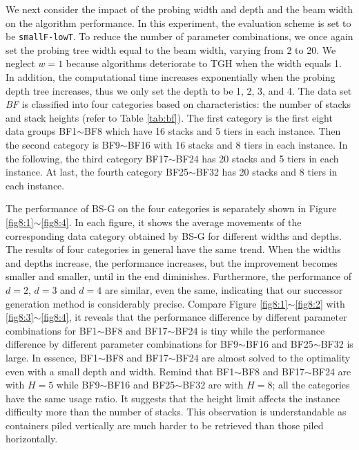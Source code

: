 \documentclass[review,3p,times,authoryear,12pt]{elsarticle}
\begin{document}
We next consider the impact of the probing width and depth and the beam width on the algorithm performance. In this experiment, the evaluation scheme is set to be \texttt{smallF-lowT}. To reduce the number of parameter combinations, we once again set the probing tree width equal to the beam width, varying from 2 to 20. We neglect $w=1$ because algorithms deteriorate to TGH when the width equals 1. In addition, the computational time increases exponentially when the probing depth tree increases, thus we only set the depth to be 1, 2, 3, and 4. The data set {\em BF} is classified into four categories based on characteristics: the number of stacks and stack heights (refer to Table \ref{tab:bf}). The first category is the first eight data groups BF1$\sim$BF8 which have 16 stacks and 5 tiers in each instance. Then the second category is BF9$\sim$BF16 with 16 stacks and 8 tiers in each instance. In the following, the third category BF17$\sim$BF24 has 20 stacks and 5 tiers in each instance. At last, the fourth category BF25$\sim$BF32 has 20 stacks and 8 tiers in each instance.

The performance of BS-G on the four categories is separately shown in Figure \ref{fig8:1}$\sim$\ref{fig8:4}. In each figure, it shows the average movements of the corresponding data category obtained by BS-G for different widths and depths. The results of four categories in general have the same trend. When the widths and depths increase, the performance increases, but the improvement becomes smaller and smaller, until in the end diminishes. Furthermore, the performance of $d=2$, $d=3$ and $d=4$ are similar, even the same, indicating that our successor generation method is considerably precise. Compare Figure \ref{fig8:1}$\sim$\ref{fig8:2} with \ref{fig8:3}$\sim$\ref{fig8:4}, it reveals that the performance difference by different parameter combinations for BF1$\sim$BF8 and BF17$\sim$BF24 is tiny while the performance difference by different parameter combinations for BF9$\sim$BF16 and BF25$\sim$BF32 is large. In essence, BF1$\sim$BF8 and BF17$\sim$BF24 are almost solved to the optimality even with a small depth and width. Remind that BF1$\sim$BF8 and BF17$\sim$BF24 are with $H=5$ while BF9$\sim$BF16 and BF25$\sim$BF32 are with $H=8$; all the categories have the same usage ratio. It suggests that the height limit affects the instance difficulty more than the number of stacks. This observation is understandable as containers piled vertically are much harder to be retrieved than those piled horizontally. %
\end{document}
